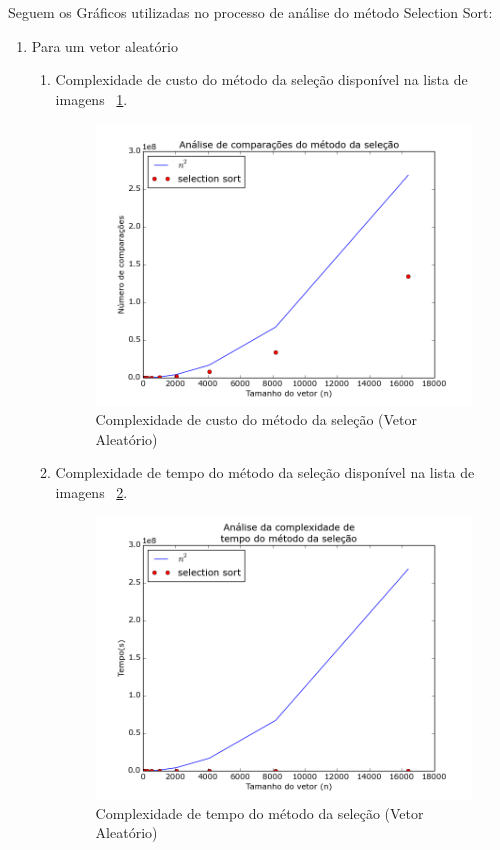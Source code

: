 \documentclass[12pt,a4paper,twoside]{report}
\begin{document}
Seguem os Gráficos utilizadas no processo de análise do método Selection Sort:
\begin{enumerate}

	\item Para um vetor aleatório
	\begin{enumerate}
		\item Complexidade de custo do método da seleção disponível na lista de imagens ~\ref{fig:SelectionPlot1A}.
		\begin{figure}[!h]
			\centering
			\includegraphics[scale=0.6]{../imagens/Selection/selection_plot_1_aleatorio.png}
			\caption{Complexidade de custo do método da seleção (Vetor Aleatório) \label{fig:SelectionPlot1A}}
		\end{figure}


		\item Complexidade de tempo do método da seleção disponível na lista de imagens ~\ref{fig:SelectionPlot2A}.
		\begin{figure}[!h]
			\centering
			\includegraphics[scale=0.6]{../imagens/Selection/selection_plot_2_aleatorio.png}
			\caption{Complexidade de tempo do método da seleção (Vetor Aleatório)\label{fig:SelectionPlot2A}}
		\end{figure}



\end{enumerate}
\end{enumerate}
\end{document}
